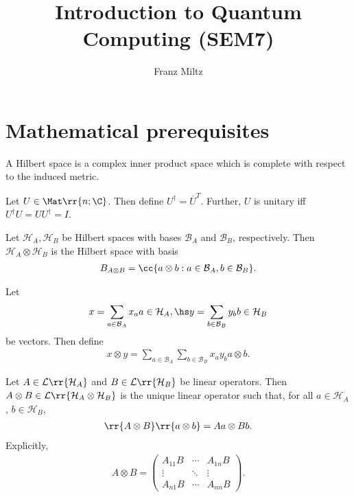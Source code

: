 \documentclass{article}
\title{Introduction to Quantum Computing (SEM7)}
\author{Franz Miltz}
\begin{document}
\maketitle
\tableofcontents
\pagebreak

\section{Mathematical prerequisites}
\label{sec:mathetmatical-prerequisites}

\begin{definition}
	\label{def:hilbert-space}
	A Hilbert space is a complex inner product space which is complete with respect to the induced metric.
\end{definition}

\begin{definition}
	\label{def:unitary-matrix}
	Let $U\in\Mat\rr{n; \C}$. Then define $U^\dagger = \overline{U}^T$. Further, $U$ is unitary iff
	$U^\dagger U =UU^\dagger = I$.
\end{definition}

\begin{definition}
	\label{def:tensor-product}
	Let $\mathcal H_A, \mathcal H_B$ be Hilbert spaces with bases $\mathcal B_A$ and
	$\mathcal B_B$, respectively. Then $\mathcal H_A\otimes\mathcal H_B$ is the Hilbert
	space with basis
	\begin{align*}
		B_{A\otimes B} = \cc{a \otimes b : a \in \mathcal B_A, b\in\mathcal B_B}.
	\end{align*}

	Let
	\begin{align*}
		x = \sum_{a\in\mathcal B_A} x_a a\in\mathcal H_A, \hs
		y = \sum_{b\in\mathcal B_B} y_b b\in\mathcal H_B
	\end{align*}
	be vectors. Then define
	\begin{align*}
		x \otimes y = \sum_{a\in\mathcal B_A}\sum_{b\in\mathcal B_B} x_a y_b a \otimes b.
	\end{align*}

	Let $A\in\mathcal L\rr{\mathcal H_A}$ and $B\in\mathcal L\rr{\mathcal H_B}$ be linear
	operators. Then $A\otimes B\in\mathcal L\rr{\mathcal H_A\otimes\mathcal H_B}$ is the
	unique linear operator such that, for all $a\in\mathcal H_A$, $b\in\mathcal H_B$,
	\begin{align*}
		\rr{A\otimes B}\rr{a \otimes b} = A a \otimes B b.
	\end{align*}
	Explicitly,
	\begin{align*}
		A \otimes B = \begin{pmatrix}
			              A_{11} B & \cdots & A_{1n}B \\
			              \vdots   & \ddots & \vdots  \\
			              A_{n1} B & \cdots & A_{nn}B
		              \end{pmatrix}.
	\end{align*}
\end{definition}
\end{document}
